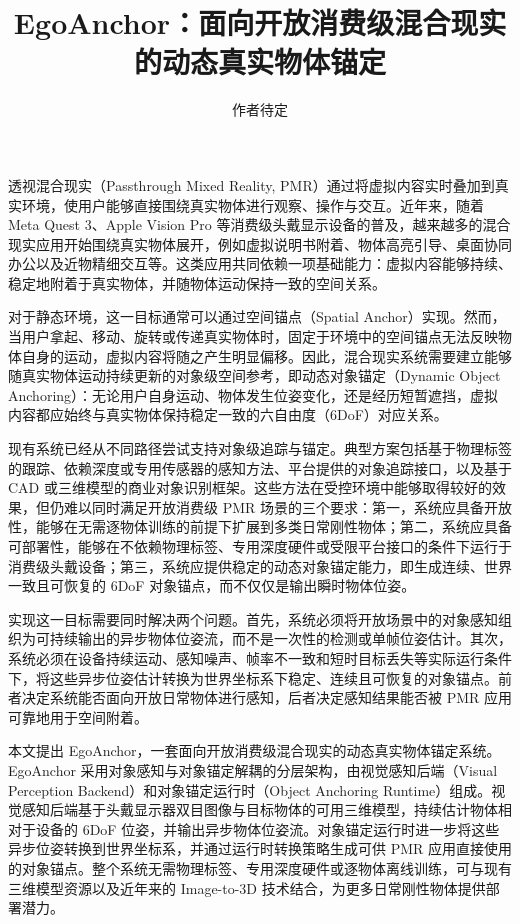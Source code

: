 \documentclass[review]{vgtc}
\title{EgoAnchor：面向开放消费级混合现实的动态真实物体锚定}
\author{作者待定}
\begin{document}
\label{sec:introduction}
\maketitle

透视混合现实（Passthrough Mixed Reality, PMR）通过将虚拟内容实时叠加到真实环境，使用户能够直接围绕真实物体进行观察、操作与交互。近年来，随着 Meta Quest 3、Apple Vision Pro 等消费级头戴显示设备的普及，越来越多的混合现实应用开始围绕真实物体展开，例如虚拟说明书附着、物体高亮引导、桌面协同办公以及近物精细交互等。这类应用共同依赖一项基础能力：虚拟内容能够持续、稳定地附着于真实物体，并随物体运动保持一致的空间关系。

对于静态环境，这一目标通常可以通过空间锚点（Spatial Anchor）实现。然而，当用户拿起、移动、旋转或传递真实物体时，固定于环境中的空间锚点无法反映物体自身的运动，虚拟内容将随之产生明显偏移。因此，混合现实系统需要建立能够随真实物体运动持续更新的对象级空间参考，即动态对象锚定（Dynamic Object Anchoring）：无论用户自身运动、物体发生位姿变化，还是经历短暂遮挡，虚拟内容都应始终与真实物体保持稳定一致的六自由度（6DoF）对应关系。

现有系统已经从不同路径尝试支持对象级追踪与锚定。典型方案包括基于物理标签的跟踪、依赖深度或专用传感器的感知方法、平台提供的对象追踪接口，以及基于 CAD 或三维模型的商业对象识别框架。这些方法在受控环境中能够取得较好的效果，但仍难以同时满足开放消费级 PMR 场景的三个要求：第一，系统应具备开放性，能够在无需逐物体训练的前提下扩展到多类日常刚性物体；第二，系统应具备可部署性，能够在不依赖物理标签、专用深度硬件或受限平台接口的条件下运行于消费级头戴设备；第三，系统应提供稳定的动态对象锚定能力，即生成连续、世界一致且可恢复的 6DoF 对象锚点，而不仅仅是输出瞬时物体位姿。

实现这一目标需要同时解决两个问题。首先，系统必须将开放场景中的对象感知组织为可持续输出的异步物体位姿流，而不是一次性的检测或单帧位姿估计。其次，系统必须在设备持续运动、感知噪声、帧率不一致和短时目标丢失等实际运行条件下，将这些异步位姿估计转换为世界坐标系下稳定、连续且可恢复的对象锚点。前者决定系统能否面向开放日常物体进行感知，后者决定感知结果能否被 PMR 应用可靠地用于空间附着。

本文提出 EgoAnchor，一套面向开放消费级混合现实的动态真实物体锚定系统。EgoAnchor 采用对象感知与对象锚定解耦的分层架构，由视觉感知后端（Visual Perception Backend）和对象锚定运行时（Object Anchoring Runtime）组成。视觉感知后端基于头戴显示器双目图像与目标物体的可用三维模型，持续估计物体相对于设备的 6DoF 位姿，并输出异步物体位姿流。对象锚定运行时进一步将这些异步位姿转换到世界坐标系，并通过运行时转换策略生成可供 PMR 应用直接使用的对象锚点。整个系统无需物理标签、专用深度硬件或逐物体离线训练，可与现有三维模型资源以及近年来的 Image-to-3D 技术结合，为更多日常刚性物体提供部署潜力。
\end{document}
